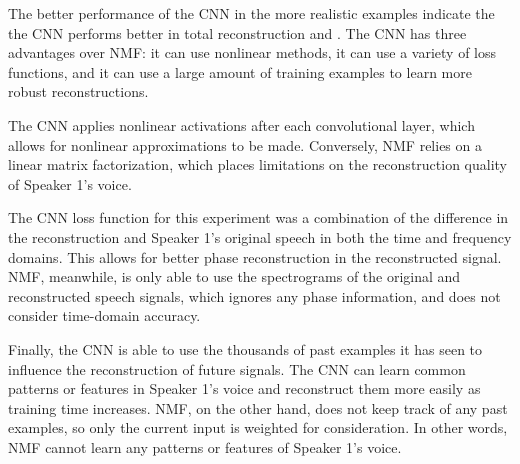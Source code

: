 \documentclass[12pt,chapterheads]{ucsd}
\begin{document}
The better performance of the CNN in the more realistic examples indicate the the CNN performs better in total reconstruction and . The CNN has three advantages over NMF: it can use nonlinear methods, it can use a variety of loss functions, and it can use a large amount of training examples to learn more robust reconstructions.

The CNN applies nonlinear activations after each convolutional layer, which allows for nonlinear approximations to be made. Conversely, NMF relies on a linear matrix factorization, which places limitations on the reconstruction quality of Speaker 1's voice.

The CNN loss function for this experiment was a combination of the difference in the reconstruction and Speaker 1's original speech in both the time and frequency domains. This allows for better phase reconstruction in the reconstructed signal. NMF, meanwhile, is only able to use the spectrograms of the original and reconstructed speech signals, which ignores any phase information, and does not consider time-domain accuracy.

Finally, the CNN is able to use the thousands of past examples it has seen to influence the reconstruction of future signals. The CNN can learn 
common patterns or features in Speaker 1's voice and reconstruct them more easily as training time increases. NMF, on the other hand, does not keep track of any past examples, so only the current input is weighted for consideration. In other words, NMF cannot learn any patterns or features of Speaker 1's voice.


\appendix



\end{document}
